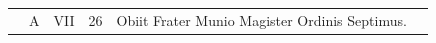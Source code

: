 \documentclass[11pt,openany]{book}
\renewcommand{\\}{\par\hspace*{1em}} %
\begin{document}
\begin{center}
\begin{tabular}{l | l | l | r | l l}
\color{Red}  & \color{Red} A & \color{Red} VII & 26 & Obiit Frater Munio Magister Ordinis Septimus. & \color{Red} \\



\end{tabular}
\end{center}
\end{document}
